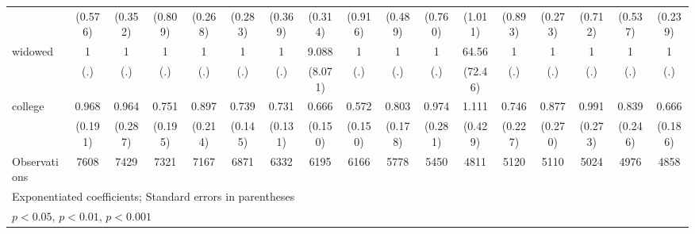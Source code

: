 {\begin{tabular}{l*{16}{c}}
                    &     (0.576)         &     (0.352)         &     (0.809)         &     (0.268)         &     (0.283)         &     (0.369)         &     (0.314)         &     (0.916)         &     (0.489)         &     (0.760)         &     (1.011)         &     (0.893)         &     (0.273)         &     (0.712)         &     (0.537)         &     (0.239)         \\
[1em]
widowed             &           1         &           1         &           1         &           1         &           1         &           1         &       9.088\sym{*}  &           1         &           1         &           1         &       64.56\sym{***}&           1         &           1         &           1         &           1         &           1         \\
                    &         (.)         &         (.)         &         (.)         &         (.)         &         (.)         &         (.)         &     (8.071)         &         (.)         &         (.)         &         (.)         &     (72.46)         &         (.)         &         (.)         &         (.)         &         (.)         &         (.)         \\
[1em]
college             &       0.968         &       0.964         &       0.751         &       0.897         &       0.739         &       0.731         &       0.666         &       0.572\sym{*}  &       0.803         &       0.974         &       1.111         &       0.746         &       0.877         &       0.991         &       0.839         &       0.666         \\
                    &     (0.191)         &     (0.287)         &     (0.195)         &     (0.214)         &     (0.145)         &     (0.131)         &     (0.150)         &     (0.150)         &     (0.178)         &     (0.281)         &     (0.429)         &     (0.227)         &     (0.270)         &     (0.273)         &     (0.246)         &     (0.186)         \\
\hline
Observations        &        7608         &        7429         &        7321         &        7167         &        6871         &        6332         &        6195         &        6166         &        5778         &        5450         &        4811         &        5120         &        5110         &        5024         &        4976         &        4858         \\
\hline\hline
\multicolumn{17}{l}{\footnotesize Exponentiated coefficients; Standard errors in parentheses}\\
\multicolumn{17}{l}{\footnotesize \sym{*} \(p<0.05\), \sym{**} \(p<0.01\), \sym{***} \(p<0.001\)}\\
\end{tabular}
}
